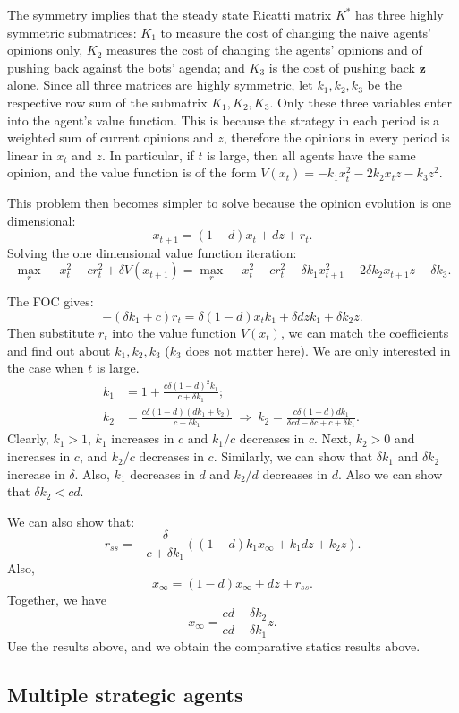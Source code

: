 \documentclass{article}
\newcommand{\z}{\mathbf{z}}
\begin{document}
The symmetry implies that the steady state Ricatti matrix $K^*$ has three highly symmetric submatrices: $K_1$ to measure the cost of changing the naive agents' opinions only, $K_2$ measures the cost of changing the agents' opinions and of pushing back against the bots' agenda; and $K_3$ is the cost of pushing back $\z$ alone. Since all three matrices are highly symmetric, let $k_1,k_2,k_3$ be the respective row sum of the submatrix $K_1,K_2,K_3$. Only these three variables enter into the agent's value function. This is because the strategy in each period is a weighted sum of current opinions and $z$, therefore the opinions in every period is linear in $x_t$ and $z$. In particular, if $t$ is large, then all agents have the same opinion, and the value function is of the form $V(x_t)=-k_1x_t^2-2k_2x_tz-k_3z^2$. 

This problem then becomes simpler to solve because the opinion evolution is one dimensional: $$x_{t+1}=(1-d)x_t+dz+r_t.$$
Solving the one dimensional value function iteration:
$$\max_r -x_t^2-cr_t^2+\delta V(x_{t+1})=\max_r -x_t^2-cr_t^2-\delta k_1x_{t+1}^2-2\delta k_2x_{t+1}z-\delta k_3.$$




The FOC gives: $$-(\delta k_1+c)r_t=\delta(1-d)x_tk_1+\delta dzk_1+\delta k_2z.$$
Then substitute $r_t$ into the value function $V(x_t)$, we can match the coefficients and find out about $k_1,k_2,k_3$ ($k_3$ does not matter here).  We are only interested in the case when $t$ is large. 
\begin{align*}
k_1& =1+\frac{c\delta(1-d)^2k_1}{c+\delta k_1};\\
k_2&=\frac{c\delta(1-d)(dk_1+k_2)}{c+\delta k_1} \ \Rightarrow \ k_2=\frac{c\delta(1-d)dk_1}{\delta cd-\delta c+c+\delta k_1}. \ 
\end{align*}
Clearly, $k_1>1$, $k_1$ increases in $c$ and $k_1/c$ decreases in $c$. Next, $k_2>0$ and increases in $c$, and $k_2/c$ decreases in $c$. Similarly, we can show that $\delta k_1$ and $\delta k_2$ increase in $\delta$. Also, $k_1$ decreases in $d$ and $k_2/d$ decreases in $d$. Also we can show that $\delta k_2<cd$.

We can also show that:
$$r_{ss}=-\frac{\delta}{c+\delta k_1}((1-d)k_1x_{\infty}+k_1dz+k_2z).$$
Also, $$x_\infty=(1-d)x_\infty+dz+r_{ss}.$$ Together, we have $$x_\infty=\frac{cd-\delta k_2}{cd+\delta k_1}z.$$ Use the results above, and we obtain the comparative statics results above.


\subsection*{Multiple strategic agents}
\end{document}
